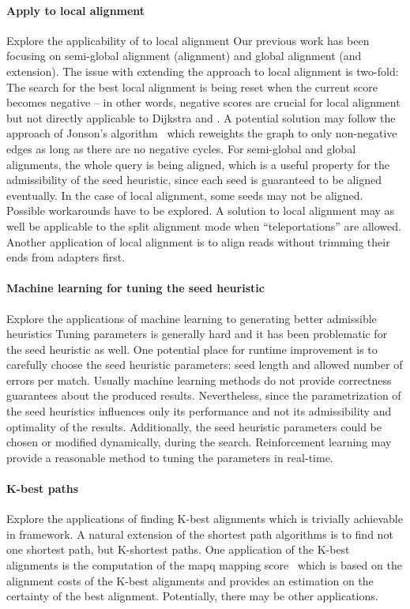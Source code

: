 \paragraph{Apply \A to local alignment}
Explore the applicability of \A to local alignment Our previous work has been
focusing on semi-global alignment (alignment) and global alignment (and
extension). The issue with extending the \A approach to local alignment is
two-fold: The search for the best local alignment is being reset when the
current score becomes negative – in other words, negative scores are crucial for
local alignment but not directly applicable to Dijkstra and \A. A potential
solution may follow the approach of Jonson's
algorithm~\citep{johnson1977efficient} which reweights the graph to only
non-negative edges as long as there are no negative cycles. For semi-global and
global alignments, the whole query is being aligned, which is a useful property
for the admissibility of the seed heuristic, since each seed is guaranteed to be
aligned eventually. In the case of local alignment, some seeds may not be
aligned. Possible workarounds have to be explored. A solution to local alignment
may as well be applicable to the split alignment mode when ``teleportations''
are allowed. Another application of local alignment is to align reads without
trimming their ends from adapters first.

\paragraph{Machine learning for tuning the seed heuristic}
Explore the applications of machine learning to generating better admissible
heuristics Tuning parameters is generally hard and it has been problematic for
the seed heuristic as well. One potential place for runtime improvement is to
carefully choose the seed heuristic parameters: seed length and allowed number
of errors per match. Usually machine learning methods do not provide correctness
guarantees about the produced results. Nevertheless, since the parametrization
of the seed heuristics influences only its performance and not its admissibility
and optimality of the results. Additionally, the seed heuristic parameters could
be chosen or modified dynamically, during the \A search. Reinforcement learning
may provide a reasonable method to tuning the parameters in real-time.

\paragraph{K-best paths}
Explore the applications of finding K-best alignments which is trivially
achievable in \A framework. A natural extension of the shortest path algorithms
is to find not one shortest path, but K-shortest paths. One application of the
K-best alignments is the computation of the mapq mapping
score~\citep{li2008mapping} which is based on the alignment costs of the K-best
alignments and provides an estimation on the certainty of the best alignment.
Potentially, there may be other applications.

